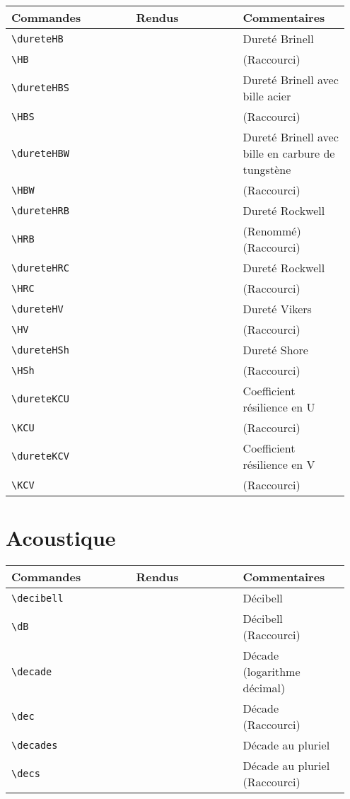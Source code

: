 \documentclass[a4paper,12pt]{article}
\newcommand{\rac}{({\color{red}Raccourci})}
\newcommand{\ren}{({\color{blue}Renommé})}
\begin{document}
	
	\noindent
	\begin{tabular}{|p{0.35\linewidth}|p{0.3\linewidth}|p{0.3\linewidth}|}
		\hline
 			\textbf{Commandes}&\textbf{Rendus}&\textbf{Commentaires}
 		\\\hline\hline
			\verb!\dureteHB!	& 	\dureteHB	&	Dureté Brinell\\
		\hline
			\verb!\HB!		& 	\HB		&	\rac\\
		\hline
			\verb!\dureteHBS!	& 	\dureteHBS	&	Dureté Brinell avec bille acier\\
		\hline
			\verb!\HBS!		& 	\HBS		&	\rac\\
		\hline
			\verb!\dureteHBW!	& 	\dureteHBW	&	Dureté Brinell avec bille en carbure de tungstène\\
		\hline
			\verb!\HBW!		& 	\HBW		&	\rac\\
		\hline
			\verb!\dureteHRB!	& 	\dureteHRB	&	Dureté Rockwell	\\
		\hline
			\verb!\HRB!		& 	\HRB		&	\ren \rac\\
		\hline
			\verb!\dureteHRC!	& 	\dureteHRC	&	Dureté Rockwell\\
		\hline
			\verb!\HRC!		& 	\HRC		&	\rac\\
		\hline
			\verb!\dureteHV!	& 	\dureteHV	&	Dureté Vikers\\
		\hline
			\verb!\HV!		& 	\HV		&	\rac\\
		\hline
			\verb!\dureteHSh!	& 	\dureteHSh	&	Dureté Shore\\
		\hline
			\verb!\HSh!		& 	\HSh		&	\rac\\
		\hline
			\verb!\dureteKCU!	& 	\dureteKCU	&	Coefficient résilience en U\\
		\hline
			\verb!\KCU!		& 	\KCU		&	\rac\\
		\hline
			\verb!\dureteKCV!	& 	\dureteKCV	&	Coefficient résilience en V\\
		\hline
			\verb!\KCV!		& 	\KCV		&	\rac\\
		\hline
	\end{tabular}
	
	
	
	\section{Acoustique}
	
	\noindent
	\begin{tabular}{|p{0.35\linewidth}|p{0.3\linewidth}|p{0.3\linewidth}|}
		\hline
 			\textbf{Commandes}&\textbf{Rendus}&\textbf{Commentaires}
 		\\\hline\hline
			\verb!\decibell!	& 	\decibell	&	Décibell\\
		\hline
			\verb!\dB!		& 	\dB		&	Décibell \rac\\
		\hline
			\verb!\decade!		& 	\decade		&	Décade (logarithme décimal)\\
		\hline
			\verb!\dec!		& 	\dec		&	Décade \rac\\
		\hline
			\verb!\decades!		& 	\decades	&	Décade au pluriel\\
		\hline
			\verb!\decs!		& 	\decs		&	Décade au pluriel \rac\\
		\hline
	\end{tabular}
\end{document}
